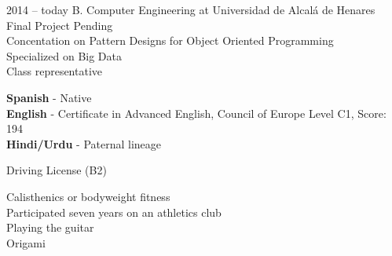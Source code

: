 \documentclass[9pt]{developercv} %
\begin{document}
\vspace{0.3cm}

\begin{entrylist}
	\entry
		{2014 -- today}
		{B. Computer Engineering at Universidad de Alcalá de Henares} 
		{}
		{\\Final Project Pending\\Concentation on Pattern Designs for Object Oriented Programming\\Specialized on Big Data\\Class representative}
\end{entrylist}


\begin{minipage}[t]{0.7\textwidth}
	\vspace{-\baselineskip} %
	
	\textbf{Spanish} - Native\\
	\textbf{English} - Certificate in Advanced English, Council of Europe Level C1, Score: 	194 \\
	\textbf{Hindi/Urdu} - Paternal lineage
\end{minipage}
\hfill
\begin{minipage}[t]{0.3\textwidth}
	\vspace{0mm}
	
	Driving License (B2)
\end{minipage}

\vspace{0.3cm}

\begin{minipage}[t]{1\textwidth}

	Calisthenics or bodyweight fitness\\
	Participated seven years on an athletics club\\
	Playing the guitar\\
	Origami\\

\end{minipage}
\hfill


\end{document}
